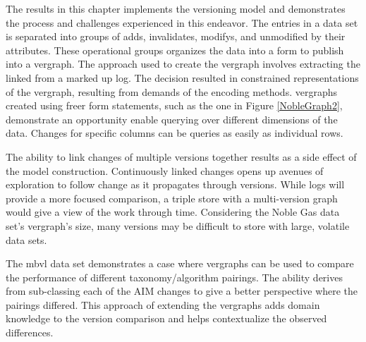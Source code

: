 The results in this chapter implements the versioning model and demonstrates the process and challenges experienced in this endeavor.
The entries in a data set is separated into groups of \glspl{add}, \glspl{invalidate}, \glspl{modify}, and unmodified by their \glspl{attribute}.
These operational groups organizes the data into a form to publish into a \gls{vergraph}.
The approach used to create the \gls{vergraph} involves extracting the \gls{linked} from a marked up \gls{log}.
The decision resulted in constrained representations of the \gls{vergraph}, resulting from demands of the encoding methods.
\Glspl{vergraph} created using freer form statements, such as the one in Figure \ref{NobleGraph2}, demonstrate an opportunity enable querying over different dimensions of the data.
Changes for specific columns can be queries as easily as individual rows.

The ability to link \glspl{change} of multiple \glspl{version} together results as a side effect of the model construction.
Continuously linked \glspl{change} opens up avenues of exploration to follow change as it propagates through \glspl{version}.
While \glspl{log} will provide a more focused comparison, a triple store with a multi-version graph would give a view of the work through time.
Considering the Noble Gas data set's \gls{vergraph}'s size, many \glspl{version} may be difficult to store with large, volatile data sets.

The \gls{mbvl} data set demonstrates a case where \glspl{vergraph} can be used to compare the performance of different taxonomy/algorithm pairings.
The ability derives from sub-classing each of the \gls{AIM} \glspl{change} to give a better perspective where the pairings differed.
This approach of extending the \glspl{vergraph} adds domain knowledge to the version comparison and helps contextualize the observed differences.
